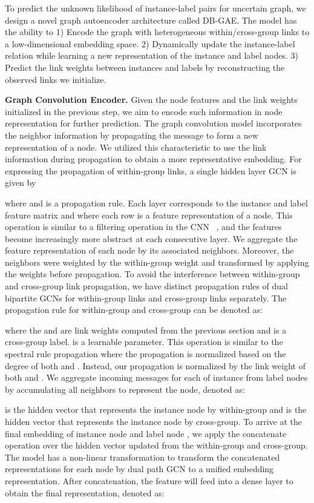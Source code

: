 \documentclass[letterpaper]{article} \usepackage{aaai20}  \usepackage{times}  \usepackage{helvet} \usepackage{courier}  \usepackage[hyphens]{url}  \usepackage{graphicx} \urlstyle{rm} \def\UrlFont{\rm}  \frenchspacing  \setlength{\pdfpagewidth}{8.5in}  \setlength{\pdfpageheight}{11in}  \frenchspacing
\begin{document}
To predict the unknown likelihood of instance-label pairs for uncertain graph, we design a novel graph autoencoder architecture called DB-GAE. The model has the ability to 1) Encode the graph  with heterogeneous within/cross-group links to a low-dimensional embedding space. 2) Dynamically update the instance-label relation while learning a new representation of the instance and label nodes. 3) Predict the link weights between instances and labels by reconstructing the observed links we initialize.


\noindent\textbf{Graph Convolution Encoder.}
Given the node features  and the link weights  initialized in the previous step, we aim to encode such information in node representation for further prediction.
The graph convolution model incorporates the neighbor information by propagating the message to form a new representation of a node. We utilized this characteristic to use the link information during propagation to obtain a more representative embedding. 
For expressing the propagation of within-group links, a single hidden layer GCN is given by

where  and  is a propagation rule. Each layer  corresponds to the instance and label feature matrix  and where each row is a feature representation of a node. 
This operation is similar to a filtering operation in the CNN ~\cite{lecun1995convolutional}, and the features become increasingly more abstract at each consecutive layer. We aggregate the feature representation of each node by its associated neighbors. Moreover, the neighbors were weighted by the within-group weight  and transformed by applying the weights  before propagation. 
 To avoid the interference between within-group and cross-group link propagation, we have distinct propagation rules of dual bipartite GCNs for within-group links and cross-group links separately.
 The propagation rule for within-group and cross-group can be denoted as: 

where the  and  are link weights computed from the previous section and  is a cross-group label.  is a learnable parameter.
This operation is similar to the spectral rule propagation \cite{kipf2016semi} where the propagation is normalized based on the degree of both  and . Instead, our propagation is normalized by the link weight of both  and . 
We aggregate incoming messages for each of instance from label nodes by accumulating all neighbors  to represent the node, denoted as:

 is the hidden vector that represents the instance node  by within-group and  is the hidden vector that represents the instance node  by cross-group. 
To arrive at the final embedding of instance node  and label node , we apply the concatenate operation over the hidden vector updated from the within-group and cross-group.
The model has a non-linear transformation to transform the concatenated representations for each node by dual path GCN to a unified embedding representation. After concatenation, the feature will feed into a dense layer to obtain the final representation, denoted as:
\end{document}
